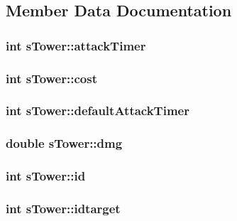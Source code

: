 \subsection{Member Data Documentation}
\hypertarget{structs_tower_ae7011237193523458ecce3b90d200057}{
\subsubsection[{attack\-Timer}]{\setlength{\rightskip}{0pt plus 5cm}int s\-Tower\-::attack\-Timer}}\label{structs_tower_ae7011237193523458ecce3b90d200057}
\hypertarget{structs_tower_a5d829c98e70fa2b23f3dd5b88d88c011}{
\subsubsection[{cost}]{\setlength{\rightskip}{0pt plus 5cm}int s\-Tower\-::cost}}\label{structs_tower_a5d829c98e70fa2b23f3dd5b88d88c011}
\hypertarget{structs_tower_aaa900c24105d980a684815fa9d933ebd}{
\subsubsection[{default\-Attack\-Timer}]{\setlength{\rightskip}{0pt plus 5cm}int s\-Tower\-::default\-Attack\-Timer}}\label{structs_tower_aaa900c24105d980a684815fa9d933ebd}
\hypertarget{structs_tower_a0c590cfdfbe22e0e65ca8e9c223df668}{
\subsubsection[{dmg}]{\setlength{\rightskip}{0pt plus 5cm}double s\-Tower\-::dmg}}\label{structs_tower_a0c590cfdfbe22e0e65ca8e9c223df668}
\hypertarget{structs_tower_ad7fbe8e544beaf6d2db2205bbdb99435}{
\subsubsection[{id}]{\setlength{\rightskip}{0pt plus 5cm}int s\-Tower\-::id}}\label{structs_tower_ad7fbe8e544beaf6d2db2205bbdb99435}
\hypertarget{structs_tower_a3a2434471dec8e3a4d46cdd9aa635c79}{
\subsubsection[{idtarget}]{\setlength{\rightskip}{0pt plus 5cm}int s\-Tower\-::idtarget}}\label{structs_tower_a3a2434471dec8e3a4d46cdd9aa635c79}
